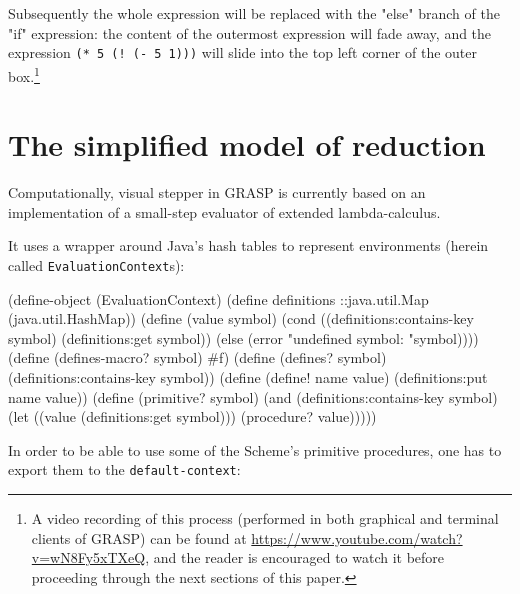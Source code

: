 \documentclass[acmsmall]{acmart}
\newenvironment{Snippet}{\Verbatim[samepage=true]}{\endVerbatim}
\begin{document}
Subsequently the whole expression will be replaced with the "else"
branch of the "if" expression: the content of the outermost expression
will fade away, and the expression \texttt{(* 5 (! (- 5 1)))} will
slide into the top left corner of the outer box.\footnote{A video
recording of this process (performed in both graphical and terminal
clients of GRASP) can be found at
\url{https://www.youtube.com/watch?v=wN8Fy5xTXeQ}, and the reader is
encouraged to watch it before proceeding through the next sections of
this paper.}

\section{The simplified model of reduction}

Computationally, visual stepper in GRASP is currently based on an
implementation of a small-step evaluator of extended lambda-calculus.

It uses a wrapper around Java's hash tables to represent
environments (herein called \texttt{Evalu\-ation\-Con\-text}s):

\begin{Snippet}
(define-object (EvaluationContext)
\end{Snippet}
\begin{Snippet}
  (define definitions ::java.util.Map
    (java.util.HashMap))
\end{Snippet}
\begin{Snippet}
  (define (value symbol)
    (cond ((definitions:contains-key symbol)
	   (definitions:get symbol))
	  (else
	   (error "undefined symbol: "symbol))))
\end{Snippet}
\begin{Snippet}
  (define (defines-macro? symbol)
    #f)
\end{Snippet}
\begin{Snippet}
  (define (defines? symbol)
    (definitions:contains-key symbol))
\end{Snippet}
\begin{Snippet}
  (define (define! name value)
    (definitions:put name value))
\end{Snippet}
\begin{Snippet}
  (define (primitive? symbol)
    (and (definitions:contains-key symbol)
	 (let ((value (definitions:get symbol)))
	   (procedure? value)))))
\end{Snippet}

In order to be able to use some of the Scheme's primitive
procedures, one has to export them to the \texttt{default-context}:
\end{document}

